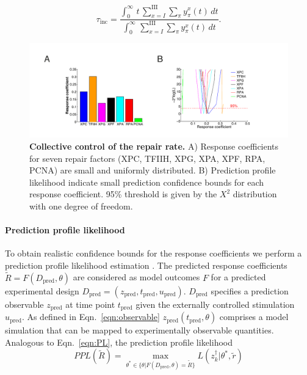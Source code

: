 \begin{equation}
\tau_{\text{inc}}=\frac{\int^\infty_0 \,t \,\sum_{x=I}^{\text{III}} \sum_ \pi  y_\pi^x(t)\,dt}{\int^\infty_0  \,\sum_{x=I}^{\text{III}} \sum_ \pi  y_\pi^x(t)\,dt}.
\end{equation}    



\begin{figure}[htbp]
	\begin{center}
		\includegraphics[width=1\textwidth]{Abbildungen/figure3_1.pdf}
		\caption{\textbf{Collective control of the repair rate.} A) Response coefficients for seven repair factors (XPC, TFIIH, XPG, XPA, XPF, RPA, PCNA) are small and uniformly distributed. B) Prediction profile likelihood indicate small prediction confidence bounds for each response coefficient. 95\% threshold is given by the $X^2$ distribution with one degree of freedom.}
		\label{fig:controlCoefficients}
	\end{center}
\end{figure}

\paragraph{Prediction profile likelihood}
To obtain realistic confidence bounds for the response coefficients we perform a prediction profile likelihood estimation \cite{Kreutz2012,Hinkley1979}. The predicted response coefficients $\tilde{R} = F(D_{\text{pred}},\theta)$ are considered as model outcomes $F$ for a predicted experimental design $D_{\text{pred}}= (z_{\text{pred}},t_{\text{pred}},u_{\text{pred}})$. $D_{\text{pred}}$ specifies a prediction observable $z_{\text{pred}}$ at time point $t_{\text{pred}}$ given the externally controlled stimulation $u_{\text{pred}}$. As defined in Eqn.\ \ref{eqn:observable} $z_{\text{pred}}(t_{\text{pred}},\theta)$ comprises a model simulation that can be mapped to experimentally observable quantities. Analogous to Eqn.\ \ref{eqn:PL}, the prediction profile likelihood 
\begin{equation}
PPL(\tilde{R}) = \max_{\theta^\ast \in \{\theta \lvert F(D_{\text{pred}},\theta)=\tilde{R}\}} L(z_k^\dag \lvert \theta^\ast,\tilde{r}) 
\end{equation}   

